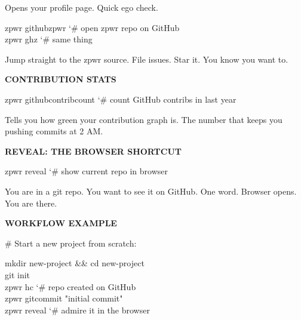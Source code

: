 \documentclass[11pt,a4paper,twoside]{book}
\begin{document}
Opens your profile page. Quick ego check.

\begin{codebox}
\color{neongreen}zpwr githubzpwr        {\char`\#} open zpwr repo on GitHub\\
\color{neongreen}zpwr ghz              {\char`\#} same thing\\
\end{codebox}

Jump straight to the zpwr source. File issues. Star it. You know you want to.


\vspace{12pt}
{\bfseries\color{neonyellow} CONTRIBUTION STATS}\vspace{4pt}

\begin{codebox}
\color{neongreen}zpwr githubcontribcount {\char`\#} count GitHub contribs in last year\\
\end{codebox}

Tells you how green your contribution graph is. The number that keeps you pushing commits at 2 AM.


\vspace{12pt}
{\bfseries\color{neonyellow} REVEAL: THE BROWSER SHORTCUT}\vspace{4pt}

\begin{codebox}
\color{neongreen}zpwr reveal            {\char`\#} show current repo in browser\\
\end{codebox}

You are in a git repo. You want to see it on GitHub. One word. Browser opens. You are there.


\vspace{12pt}
{\bfseries\color{neonyellow} WORKFLOW EXAMPLE}\vspace{4pt}

\# Start a new project from scratch:

\begin{codebox}
\color{neongreen}mkdir new-project \&\& cd new-project\\
\color{neongreen}git init\\
\color{neongreen}zpwr hc               {\char`\#} repo created on GitHub\\
\color{neongreen}zpwr gitcommit "initial commit"\\
\color{neongreen}zpwr reveal            {\char`\#} admire it in the browser\\
\end{codebox}
\end{document}
